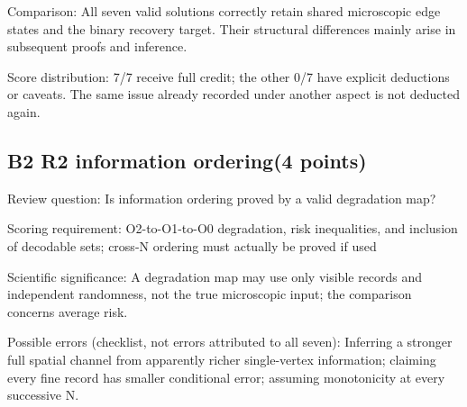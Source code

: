 \documentclass[11pt,a4paper]{article}
\begin{document}
Comparison: All seven valid solutions correctly retain shared microscopic edge states and the binary recovery target. Their structural differences mainly arise in subsequent proofs and inference.

Score distribution: 7/\allowbreak{}7 receive full credit; the other 0/\allowbreak{}7 have explicit deductions or caveats. The same issue already recorded under another aspect is not deducted again.

\clearpage
\subsection{B2 R2 information ordering(4 points)}
\label{aspect:B2}
Review question: Is information ordering proved by a valid degradation map?

Scoring requirement: O2-to-O1-to-O0 degradation,\allowbreak{} risk inequalities,\allowbreak{} and inclusion of decodable sets; cross-N ordering must actually be proved if used

Scientific significance: A degradation map may use only visible records and independent randomness,\allowbreak{} not the true microscopic input; the comparison concerns average risk.

Possible errors (checklist,\allowbreak{} not errors attributed to all seven): Inferring a stronger full spatial channel from apparently richer single-vertex information; claiming every fine record has smaller conditional error; assuming monotonicity at every successive N.
\end{document}
